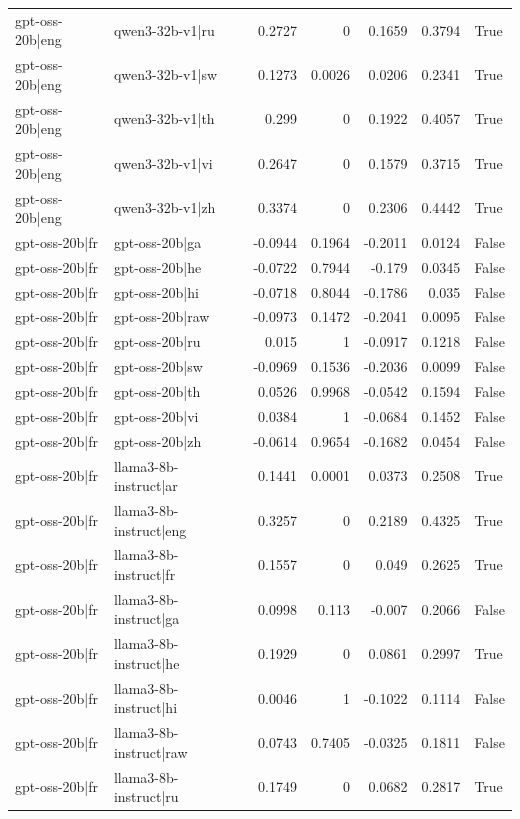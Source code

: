 \begin{table}
\begin{tabular}{l l r r r r l}
gpt-oss-20b|eng & qwen3-32b-v1|ru & 0.2727 & 0 & 0.1659 & 0.3794 & True \\
gpt-oss-20b|eng & qwen3-32b-v1|sw & 0.1273 & 0.0026 & 0.0206 & 0.2341 & True \\
gpt-oss-20b|eng & qwen3-32b-v1|th & 0.299 & 0 & 0.1922 & 0.4057 & True \\
gpt-oss-20b|eng & qwen3-32b-v1|vi & 0.2647 & 0 & 0.1579 & 0.3715 & True \\
gpt-oss-20b|eng & qwen3-32b-v1|zh & 0.3374 & 0 & 0.2306 & 0.4442 & True \\
gpt-oss-20b|fr & gpt-oss-20b|ga & -0.0944 & 0.1964 & -0.2011 & 0.0124 & False \\
gpt-oss-20b|fr & gpt-oss-20b|he & -0.0722 & 0.7944 & -0.179 & 0.0345 & False \\
gpt-oss-20b|fr & gpt-oss-20b|hi & -0.0718 & 0.8044 & -0.1786 & 0.035 & False \\
gpt-oss-20b|fr & gpt-oss-20b|raw & -0.0973 & 0.1472 & -0.2041 & 0.0095 & False \\
gpt-oss-20b|fr & gpt-oss-20b|ru & 0.015 & 1 & -0.0917 & 0.1218 & False \\
gpt-oss-20b|fr & gpt-oss-20b|sw & -0.0969 & 0.1536 & -0.2036 & 0.0099 & False \\
gpt-oss-20b|fr & gpt-oss-20b|th & 0.0526 & 0.9968 & -0.0542 & 0.1594 & False \\
gpt-oss-20b|fr & gpt-oss-20b|vi & 0.0384 & 1 & -0.0684 & 0.1452 & False \\
gpt-oss-20b|fr & gpt-oss-20b|zh & -0.0614 & 0.9654 & -0.1682 & 0.0454 & False \\
gpt-oss-20b|fr & llama3-8b-instruct|ar & 0.1441 & 0.0001 & 0.0373 & 0.2508 & True \\
gpt-oss-20b|fr & llama3-8b-instruct|eng & 0.3257 & 0 & 0.2189 & 0.4325 & True \\
gpt-oss-20b|fr & llama3-8b-instruct|fr & 0.1557 & 0 & 0.049 & 0.2625 & True \\
gpt-oss-20b|fr & llama3-8b-instruct|ga & 0.0998 & 0.113 & -0.007 & 0.2066 & False \\
gpt-oss-20b|fr & llama3-8b-instruct|he & 0.1929 & 0 & 0.0861 & 0.2997 & True \\
gpt-oss-20b|fr & llama3-8b-instruct|hi & 0.0046 & 1 & -0.1022 & 0.1114 & False \\
gpt-oss-20b|fr & llama3-8b-instruct|raw & 0.0743 & 0.7405 & -0.0325 & 0.1811 & False \\
gpt-oss-20b|fr & llama3-8b-instruct|ru & 0.1749 & 0 & 0.0682 & 0.2817 & True \\

\end{tabular}
\end{table}
